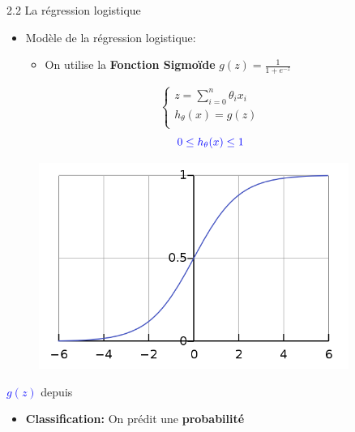 \begin{frame}{2.2 La régression logistique}
  \begin{itemize}
  \item Modèle de la régression logistique:
    \begin{itemize}
      \item On utilise la \textbf{Fonction Sigmoïde} $g(z)=\frac{1}{1+e^{-z}}$
    \end{itemize}
  \end{itemize}
  \begin{minipage}{0.4\textwidth}
    \begin{equation*}
      \begin{cases}
        z = \displaystyle\sum_{i=0}^{n} \theta_{i} x_{i}\\
        h_\theta(x) = g(z) \\
      \end{cases}
    \end{equation*}
    \vfill
    \begin{equation*}
      \textcolor{blue}{0 \leq h_{\theta}(x) \leq 1}
    \end{equation*}
  \end{minipage}
  \begin{minipage}{0.5\textwidth}
    \begin{figure}
      \includegraphics[width=0.9\textwidth]{figs/logisticFct.png}
    \end{figure}
    \begin{center}
      \tiny
      \vspace{-0.5cm}
      \textcolor{blue}{$g(z)$} depuis \href{https://en.wikipedia.org/wiki/Sigmoid_function}{\color{blue}{Wikipedia}}
    \end{center}
  \end{minipage}
  \vfill
  \begin{itemize}
  \item \textbf{Classification:} On prédit une \textbf{probabilité}
  \end{itemize}
\end{frame}

